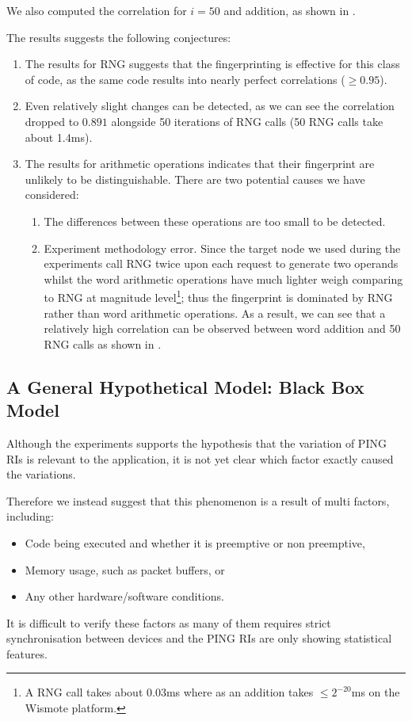 We also computed the correlation for $i=50$ and addition, as shown in .

The results suggests the following conjectures:
\begin{enumerate}
\item The results for RNG suggests that the fingerprinting is effective for this class of code, as the same code results into nearly perfect correlations ($\geq 0.95$).

\item Even relatively slight changes can be detected, as we can see the correlation dropped to $0.891$ alongside 50 iterations of RNG calls (50 RNG calls take about 1.4ms).

\item The results for arithmetic operations indicates that their  fingerprint are unlikely to be distinguishable. There are two potential causes we have considered:
\begin{enumerate}
\item The differences between these operations are too small to be detected.

\item Experiment methodology error. Since the target node we used during the experiments call RNG twice upon each request to generate two operands whilst the word arithmetic operations have much lighter weigh comparing to RNG at magnitude level\footnote{A RNG call takes about 0.03ms where as an addition takes $\leq 2^{-20}$ms on the Wismote platform. }; thus the fingerprint is dominated by RNG rather than word arithmetic operations. As a result, we can see that a relatively high correlation can be observed between word addition and 50 RNG calls as shown in .
\end{enumerate}
\end{enumerate}

\subsection{A General Hypothetical Model: Black Box Model}
Although the experiments supports the hypothesis that the variation of PING RIs is relevant to the application, it is not yet clear which factor exactly caused the variations. 

Therefore we instead suggest that this phenomenon is a result of multi factors, including:
\begin{itemize} 
\item Code being executed  and whether it is preemptive or non preemptive, 
\item Memory usage, such as packet buffers, or 
\item Any other hardware/software conditions.
\end{itemize}
It is difficult to verify these factors as many of them requires strict synchronisation between devices and the PING RIs are only showing statistical features.

